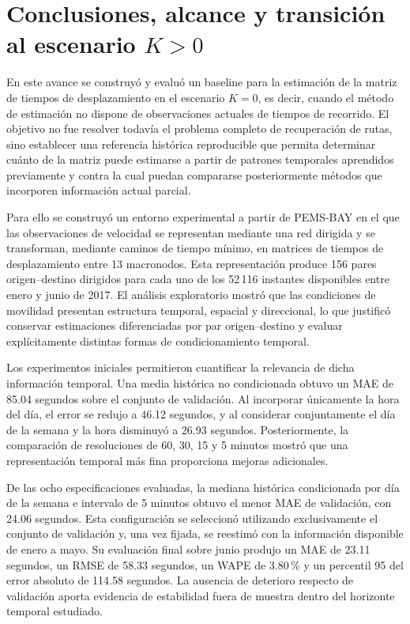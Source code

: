\documentclass[11pt]{article}
\begin{document}
\section{Conclusiones, alcance y transición al escenario $K>0$}

En este avance se construyó y evaluó un baseline para la estimación de la matriz de tiempos de desplazamiento en el escenario $K=0$, es decir, cuando el método de estimación no dispone de observaciones actuales de tiempos de recorrido. El objetivo no fue resolver todavía el problema completo de recuperación de rutas, sino establecer una referencia histórica reproducible que permita determinar cuánto de la matriz puede estimarse a partir de patrones temporales aprendidos previamente y contra la cual puedan compararse posteriormente métodos que incorporen información actual parcial.

Para ello se construyó un entorno experimental a partir de PEMS-BAY en el que las observaciones de velocidad se representan mediante una red dirigida y se transforman, mediante caminos de tiempo mínimo, en matrices de tiempos de desplazamiento entre 13 macronodos. Esta representación produce 156 pares origen--destino dirigidos para cada uno de los 52\,116 instantes disponibles entre enero y junio de 2017. El análisis exploratorio mostró que las condiciones de movilidad presentan estructura temporal, espacial y direccional, lo que justificó conservar estimaciones diferenciadas por par origen--destino y evaluar explícitamente distintas formas de condicionamiento temporal.

Los experimentos iniciales permitieron cuantificar la relevancia de dicha información temporal. Una media histórica no condicionada obtuvo un MAE de 85.04 segundos sobre el conjunto de validación. Al incorporar únicamente la hora del día, el error se redujo a 46.12 segundos, y al considerar conjuntamente el día de la semana y la hora disminuyó a 26.93 segundos. Posteriormente, la comparación de resoluciones de 60, 30, 15 y 5 minutos mostró que una representación temporal más fina proporciona mejoras adicionales.

De las ocho especificaciones evaluadas, la mediana histórica condicionada por día de la semana e intervalo de 5 minutos obtuvo el menor MAE de validación, con 24.06 segundos. Esta configuración se seleccionó utilizando exclusivamente el conjunto de validación y, una vez fijada, se reestimó con la información disponible de enero a mayo. Su evaluación final sobre junio produjo un MAE de 23.11 segundos, un RMSE de 58.33 segundos, un WAPE de 3.80\,\% y un percentil 95 del error absoluto de 114.58 segundos. La ausencia de deterioro respecto de validación aporta evidencia de estabilidad fuera de muestra dentro del horizonte temporal estudiado.
\end{document}
